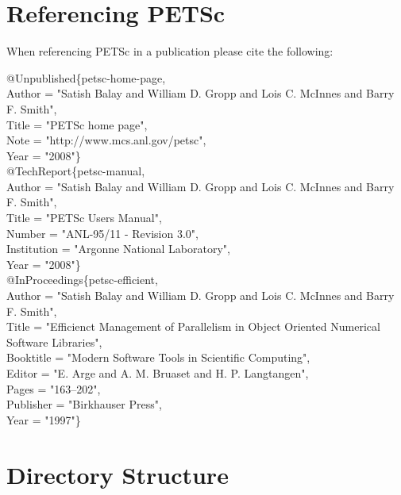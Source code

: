 
\section{Referencing PETSc}

When referencing PETSc in a publication please cite the following:
\begin{tabbing}
@Unpublished\{petsc-home-page,\\
   Author = "Satish Balay and William D. Gropp and Lois C. McInnes and Barry F. Smith",\\
   Title  = "PETSc home page",\\
   Note   = "http://www.mcs.anl.gov/petsc",\\
   Year   = "2008"\}\\

@TechReport\{petsc-manual,\\
   Author      = "Satish Balay and William D. Gropp and Lois C. McInnes and Barry F. Smith",\\
   Title       = "PETSc Users Manual",\\
   Number      = "ANL-95/11 - Revision 3.0",\\
   Institution = "Argonne National Laboratory",\\
   Year        = "2008"\}\\

@InProceedings\{petsc-efficient,\\
   Author    = "Satish Balay and William D. Gropp and Lois C. McInnes and Barry F. Smith",\\
   Title     = "Efficienct Management of Parallelism in Object Oriented Numerical Software Libraries",\\
   Booktitle = "Modern Software Tools in Scientific Computing",\\
   Editor    = "E. Arge and A. M. Bruaset and H. P. Langtangen",\\
   Pages     = "163--202",\\
   Publisher = "Birkhauser Press",\\
   Year      = "1997"\}
\end{tabbing}



\section{Directory Structure}

